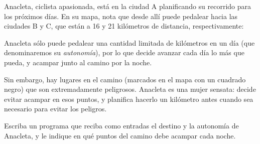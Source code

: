 Anacleta, ciclista apasionada,
está en la ciudad A planificando su recorrido para los próximos días.
En su mapa, nota que desde allí puede pedalear hacia las ciudades B y C,
que están a 16 y 21 kilómetros de distancia, respectivamente:


Anacleta sólo puede pedalear una cantidad limitada de kilómetros en un día
(que denominaremos su \emph{autonomía}),
por lo que decide avanzar cada día lo más que pueda,
y acampar junto al camino por la noche.

Sin embargo,
hay lugares en el camino (marcados en el mapa con un cuadrado negro)
que son extremadamente peligrosos.
Anacleta es una mujer sensata:
decide evitar acampar en esos puntos,
y planifica hacerlo un kilómetro antes
cuando sea necesario para evitar los peligros.

Escriba un programa que reciba como entradas
el destino y la autonomía de Anacleta,
y le indique en qué puntos del camino
debe acampar cada noche.

